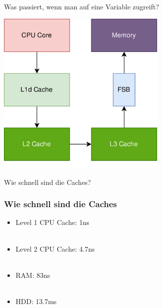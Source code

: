 \documentclass{beamer}
\begin{document}
%
\begin{frame}{Was passiert, wenn man auf eine Variable zugreift?}
\vspace*{0.5cm}
\centerline{\includegraphics[height=8cm]{trace6.png}}
\end{frame}

\begin{frame}
\centering
\Huge
    Wie schnell sind die Caches?
\end{frame}


\begin{frame}
\frametitle{Wie schnell sind die Caches}
\begin{itemize}
    \item Level 1 CPU Cache: 1ns
    \\~\\
    \item Level 2 CPU Cache: 4.7ns
    \\~\\
    \item RAM: 83ns
    \\~\\
    \item HDD: 13.7ms
\end{itemize}
\end{frame}
\end{document}
